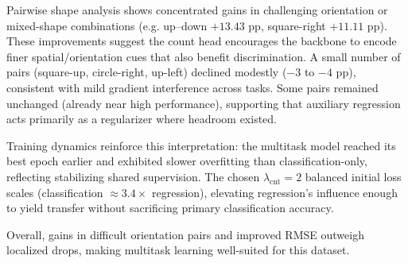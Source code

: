 \documentclass[11pt]{article}
\begin{document}
Pairwise shape analysis shows concentrated gains in challenging orientation or mixed-shape combinations (e.g. up–down $+13.43$ pp, square-right $+11.11$ pp). These improvements suggest the count head encourages the backbone to encode finer spatial/orientation cues that also benefit discrimination. A small number of pairs (square-up, circle-right, up-left) declined modestly ($-3$ to $-4$ pp), consistent with mild gradient interference across tasks. Some pairs remained unchanged (already near high performance), supporting that auxiliary regression acts primarily as a regularizer where headroom existed.

Training dynamics reinforce this interpretation: the multitask model reached its best epoch earlier and exhibited slower overfitting than classification-only, reflecting stabilizing shared supervision. The chosen $\lambda_\text{cnt} = 2$ balanced initial loss scales (classification $\approx 3.4 \times$ regression), elevating regression’s influence enough to yield transfer without sacrificing primary classification accuracy.

Overall, gains in difficult orientation pairs and improved RMSE outweigh localized drops, making multitask learning well-suited for this dataset.


\end{document}
